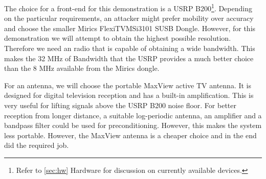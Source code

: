 \documentclass[a4paper,12pt,twoside,openright]{report}
\begin{document}
The choice for a front-end for this demonstration is a USRP B200\footnote{Refer to \ref{sec:hw} Hardware for discussion on currently available devices.}. Depending on the particular requirements, an attacker might prefer mobility over accuracy and choose the smaller Mirics FlexiTV\texttrademark MSi3101 SUSB Dongle. However, for this demonstration we will attempt to obtain the highest possible resolution. Therefore we need an radio that is capable of obtaining a wide bandwidth. This makes the 32 MHz of Bandwidth that the USRP provides a much better choice than the 8 MHz available from the Mirics dongle.

For an antenna, we will choose the portable MaxView active TV antenna. It is designed for digital television reception and has a built-in amplification. This is very useful for lifting signals above the USRP B200 noise floor. For better reception from longer distance, a suitable log-periodic antenna, an amplifier and a bandpass filter could be used for preconditioning. However, this makes the system less portable. However, the MaxView antenna is a cheaper choice and in the end did the required job.
\end{document}
